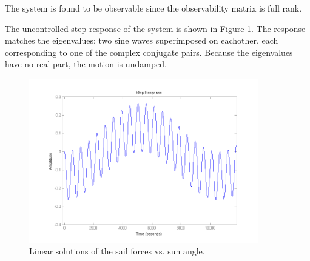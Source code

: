 \documentclass[]{aiaa-tc}%
\begin{document}
	\vspace{5 mm}

	The system is found to be observable since the observability matrix is full rank.

	\vspace{5 mm}

	The uncontrolled step response of the system is shown in Figure \ref{fig:StepResp}. The response matches the eigenvalues: two sine waves superimposed on eachother, each corresponding to one of the complex conjugate pairs. Because the eigenvalues have no real part, the motion is undamped.

	\vspace{5 mm}

	\begin{figure}[H]
		\centering
			\includegraphics[width = 10cm]{StepResponse.png}
		\caption{Linear solutions of the sail forces vs. sun angle. }
		\label{fig:StepResp}
	\end{figure}	

%    
    
%    
%    
%    
%
%
%
%
	
\end{document}
